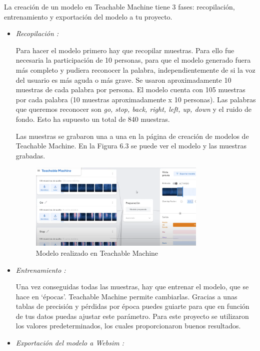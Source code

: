 La creación de un modelo en Teachable Machine tiene 3 fases: recopilación, entrenamiento y exportación del modelo a tu proyecto.

\begin{itemize}
\item \textit{Recopilación :}

Para hacer el modelo primero hay que recopilar muestras. Para ello fue necesaria la participación de 10 personas, para que el modelo generado fuera más completo y pudiera reconocer la palabra, independientemente de si la voz del usuario es más aguda o más grave.  Se usaron aproximadamente 10 muestras de cada palabra por persona. El modelo cuenta con 105 muestras por cada palabra (10 muestras aproximadamente x 10 personas). Las palabras que queremos reconocer son \textit{go, stop, back, right, left, up, down } y el ruido de fondo. Esto ha supuesto un total de 840 muestras.

Las muestras se grabaron una a una en la página de creación de modelos de Teachable Machine. En la Figura 6.3 se puede ver el modelo y las muestras grabadas.


\begin{figure}[H]
 \centering
    \includegraphics[width=0.8\textwidth, height=0.4\textwidth]{chapters/images/teachablemachine.png}
    \caption{Modelo realizado en Teachable Machine}
\end{figure}
 

\item  \textit{Entrenamiento :}

Una vez conseguidas todas las muestras, hay que entrenar el modelo, que se hace en `épocas'. Teachable Machine permite cambiarlas. Gracias a unas tablas de precisión y pérdidas por época puedes guiarte para que en función de tus datos puedas ajustar este parámetro. Para este proyecto se utilizaron los valores predeterminados, los cuales proporcionaron buenos resultados.

\item  \textit{Exportación del modelo a Websim :}


\end{itemize}
